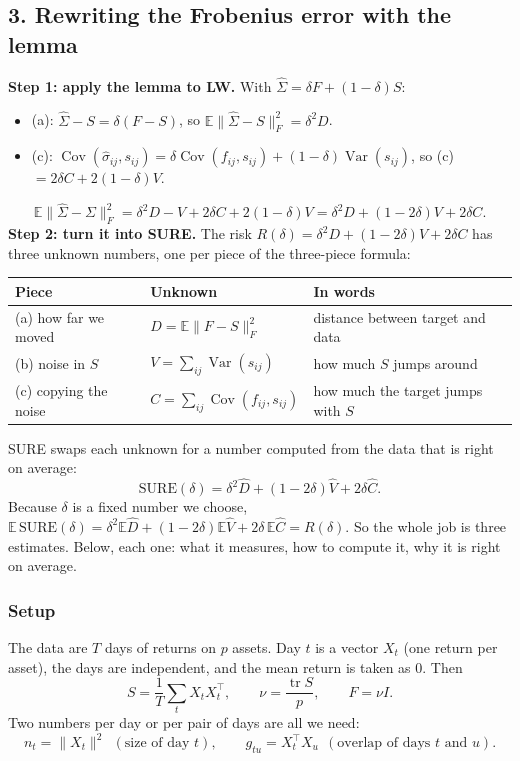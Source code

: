 \documentclass[12pt]{article}
\begin{document}
\subsection*{3. Rewriting the Frobenius error with the lemma}
\textbf{Step 1: apply the lemma to LW.} With $\hat\Sigma=\delta F+(1-\delta)S$:
\begin{itemize}
\item (a): $\hat\Sigma-S=\delta(F-S)$, so $\mathbb{E}\|\hat\Sigma-S\|_F^2=\delta^2D$.
\item (c): $\operatorname{Cov}(\hat\sigma_{ij},s_{ij})=\delta\operatorname{Cov}(f_{ij},s_{ij})+(1-\delta)\operatorname{Var}(s_{ij})$, so (c) $=2\delta C+2(1-\delta)V$.
\end{itemize}
\[
\mathbb{E}\|\hat\Sigma-\Sigma\|_F^2=\delta^2D-V+2\delta C+2(1-\delta)V=\boxed{\delta^2D+(1-2\delta)V+2\delta C}.
\]
\textbf{Step 2: turn it into SURE.} The risk $R(\delta)=\delta^2D+(1-2\delta)V+2\delta C$ has three unknown
numbers, one per piece of the three-piece formula:
\begin{center}
\begin{tabular}{@{}lll@{}}
\toprule
Piece & Unknown & In words \\
\midrule
(a) how far we moved & $D=\mathbb{E}\|F-S\|_F^2$ & distance between target and data \\
(b) noise in $S$ & $V=\sum_{ij}\operatorname{Var}(s_{ij})$ & how much $S$ jumps around \\
(c) copying the noise & $C=\sum_{ij}\operatorname{Cov}(f_{ij},s_{ij})$ & how much the target jumps with $S$ \\
\bottomrule
\end{tabular}
\end{center}
SURE swaps each unknown for a number computed from the data that is right on average:
\[
\mathrm{SURE}(\delta)=\delta^2\hat D+(1-2\delta)\hat V+2\delta\hat C .
\]
Because $\delta$ is a fixed number we choose, $\mathbb{E}\,\mathrm{SURE}(\delta)=\delta^2\mathbb{E}\hat D+(1-2\delta)\mathbb{E}\hat V+2\delta\,\mathbb{E}\hat C=R(\delta)$.
So the whole job is three estimates. Below, each one: what it measures, how to compute it, why it is
right on average.

\subsubsection*{Setup}
The data are $T$ days of returns on $p$ assets. Day $t$ is a vector $X_t$ (one return per asset), the days
are independent, and the mean return is taken as $0$. Then
\[
S=\frac1T\sum_tX_tX_t^\top,\qquad \nu=\frac{\operatorname{tr}S}{p},\qquad F=\nu I .
\]
Two numbers per day or per pair of days are all we need:
\[
n_t=\|X_t\|^2\ \ (\text{size of day }t),\qquad g_{tu}=X_t^\top X_u\ \ (\text{overlap of days }t\text{ and }u).
\]
\end{document}
